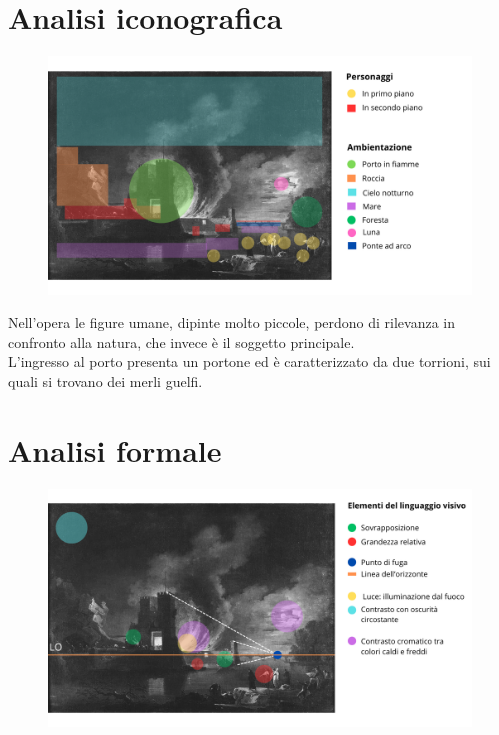 \documentclass[12pt]{article}
\begin{document}
\newpage
\section*{Analisi iconografica}
\begin{figure}[h]
    \includegraphics[scale=0.31]{analisi_iconografica}
    \centering
\end{figure}

Nell'opera le figure umane, dipinte molto piccole, perdono di rilevanza in confronto alla natura, che invece è il soggetto principale. \\
L'ingresso al porto presenta un portone ed è caratterizzato da due torrioni, sui quali si trovano dei merli guelfi.

\newpage
\section*{Analisi formale}
\begin{figure}[ht]
    \includegraphics[scale=0.3]{analisi_formale}
    \centering
\end{figure}
\end{document}
